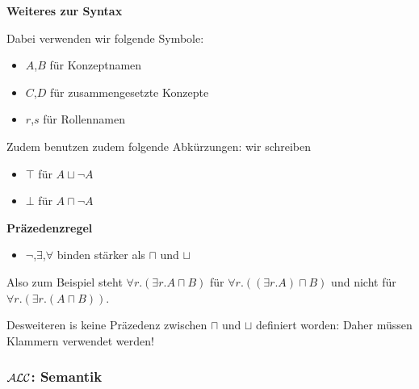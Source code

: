 \textbf{Weiteres zur Syntax}

Dabei verwenden wir folgende Symbole:

\begin{itemize}
  \item $A$,$B$ für Konzeptnamen
  \item $C$,$D$ für zusammengesetzte Konzepte
  \item $r$,$s$ für Rollennamen
\end{itemize}

Zudem benutzen zudem folgende Abkürzungen: wir schreiben

\begin{itemize}
  \item $\top$ für $A \sqcup \neg A$
  \item $\bot$ für $A \sqcap \neg A$
\end{itemize}

\textbf{Präzedenzregel}

\begin{itemize}
  \item{$\neg$,$\exists$,$\forall$ binden stärker als $\sqcap$ und $\sqcup$}
\end{itemize}

Also zum Beispiel steht $\forall r.(\exists r.A \sqcap B)$ für $\forall r.((\exists r.A) \sqcap B)$ und nicht für $\forall r.(\exists r.(A \sqcap B))$.

Desweiteren is keine Präzedenz zwischen $\sqcap$ und $\sqcup$ definiert worden: Daher müssen Klammern verwendet werden!

\subsubsection{\texorpdfstring{$\mathcal{A}\mathcal{L}\mathcal{C}$}{ALC}: Semantik}

